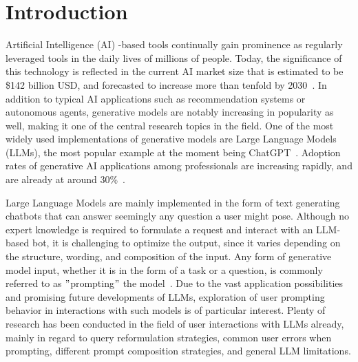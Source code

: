 \section{Introduction}
\label{sec:introduction}

\sloppy %
Artificial Intelligence (AI) -based tools continually gain prominence as regularly leveraged tools in the
daily lives of millions of people.
Today, the significance of this technology is reflected in the current AI market size that is
estimated to be \$142 billion USD, and forecasted to increase more than tenfold by 2030~\cite{statista_artificial_2023}.
In addition to typical AI applications such as recommendation systems or autonomous agents, generative
models are notably increasing in popularity as well, making it one of the central research topics
in the field.
One of the most widely used implementations of generative models are Large Language Models (LLMs),
the most popular example at the moment being ChatGPT~\cite{openai_chatgpt_2023}.
Adoption rates of generative AI applications among professionals are increasing rapidly, and are
already at
around 30\%~\cite{statista_us_2022}.

Large Language Models are mainly implemented in the form of text generating chatbots that can
answer seemingly any question a user might pose.
Although no expert knowledge is required to formulate a request and interact with an LLM-based bot, it is challenging to optimize the output, since it varies depending on the structure, wording,
and composition of the input.
Any form of generative model input, whether it is in the form of a task or a question, is
commonly referred to as \("\)prompting\("\) the model~\cite[p. 1]{white_prompt_2023}.
Due to the vast application possibilities and promising future developments of LLMs, exploration of
user prompting behavior in interactions with such models is of particular interest.
Plenty of research has been conducted in the field of user interactions with LLMs already,
mainly in regard to query reformulation strategies, common user errors when prompting,
different prompt composition strategies, and general LLM limitations.

